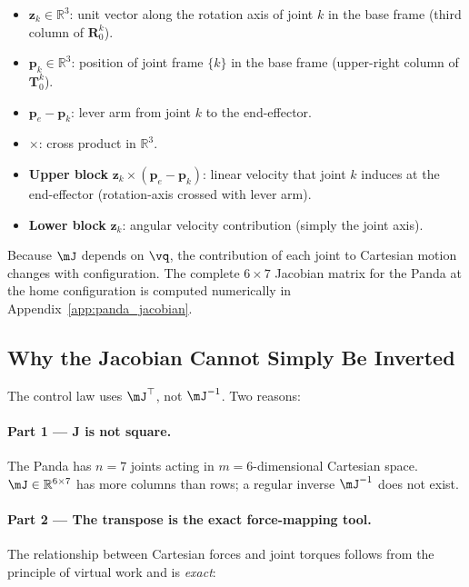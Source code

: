 \begin{itemize}
  \item $\mathbf{z}_k\in\mathbb{R}^3$: unit vector along the rotation
        axis of joint $k$ in the base frame (third column of
        $\mathbf{R}_0^k$).
  \item $\mathbf{p}_k\in\mathbb{R}^3$: position of joint frame $\{k\}$
        in the base frame (upper-right column of $\mathbf{T}_0^k$).
  \item $\mathbf{p}_e-\mathbf{p}_k$: lever arm from joint $k$ to the
        end-effector.
  \item $\times$: cross product in $\mathbb{R}^3$.
  \item \textbf{Upper block} $\mathbf{z}_k\times(\mathbf{p}_e-\mathbf{p}_k)$:
        linear velocity that joint $k$ induces at the end-effector
        (rotation-axis crossed with lever arm).
  \item \textbf{Lower block} $\mathbf{z}_k$:
        angular velocity contribution (simply the joint axis).
\end{itemize}

Because $\mJ$ depends on $\vq$, the contribution of each joint to
Cartesian motion changes with configuration.
The complete $6\times7$ Jacobian matrix for the Panda at the home
configuration is computed numerically in Appendix~\ref{app:panda_jacobian}.

\subsection{Why the Jacobian Cannot Simply Be Inverted}
\label{subsec:pinv}

The control law uses $\mJ^\top$, not $\mJ^{-1}$.
Two reasons:

\paragraph{Part 1 --- J is not square.}
The Panda has $n=7$ joints acting in $m=6$-dimensional Cartesian space.
$\mJ\in\mathbb{R}^{6\times7}$ has more columns than rows; a regular
inverse $\mJ^{-1}$ does not exist.

\paragraph{Part 2 --- The transpose is the exact force-mapping tool.}
The relationship between Cartesian forces and joint torques follows
from the principle of virtual work and is \emph{exact}:

